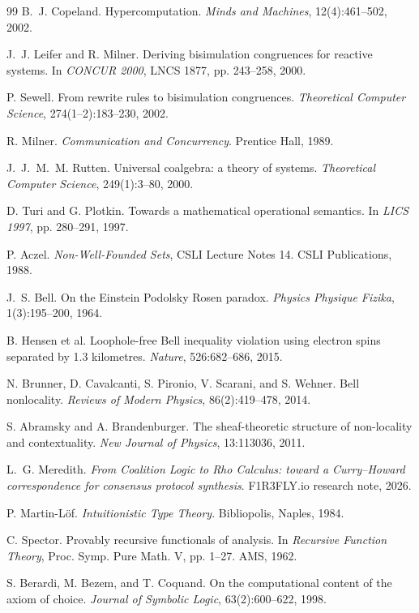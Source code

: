 \begin{thebibliography}{99}
B.~J. Copeland. Hypercomputation. \emph{Minds and Machines}, 12(4):461--502, 2002.

J.~J. Leifer and R. Milner. Deriving bisimulation congruences for reactive systems.
In \emph{CONCUR 2000}, LNCS 1877, pp. 243--258, 2000.

P. Sewell. From rewrite rules to bisimulation congruences.
\emph{Theoretical Computer Science}, 274(1--2):183--230, 2002.

R. Milner. \emph{Communication and Concurrency}. Prentice Hall, 1989.

J.~J.~M.~M. Rutten. Universal coalgebra: a theory of systems.
\emph{Theoretical Computer Science}, 249(1):3--80, 2000.

D. Turi and G. Plotkin. Towards a mathematical operational semantics.
In \emph{LICS 1997}, pp. 280--291, 1997.

P. Aczel. \emph{Non-Well-Founded Sets}, CSLI Lecture Notes 14. CSLI Publications, 1988.

J.~S. Bell. On the Einstein Podolsky Rosen paradox.
\emph{Physics Physique Fizika}, 1(3):195--200, 1964.

B. Hensen et al. Loophole-free Bell inequality violation using electron spins separated
by 1.3 kilometres. \emph{Nature}, 526:682--686, 2015.

N. Brunner, D. Cavalcanti, S. Pironio, V. Scarani, and S. Wehner. Bell nonlocality.
\emph{Reviews of Modern Physics}, 86(2):419--478, 2014.

S. Abramsky and A. Brandenburger. The sheaf-theoretic structure of non-locality and
contextuality. \emph{New Journal of Physics}, 13:113036, 2011.


L.~G. Meredith. \emph{From Coalition Logic to Rho Calculus: toward a Curry--Howard
correspondence for consensus protocol synthesis}. F1R3FLY.io research note, 2026.

P. Martin-L\"of. \emph{Intuitionistic Type Theory}. Bibliopolis, Naples, 1984.

C. Spector. Provably recursive functionals of analysis. In \emph{Recursive Function
Theory}, Proc. Symp. Pure Math. V, pp. 1--27. AMS, 1962.

S. Berardi, M. Bezem, and T. Coquand. On the computational content of the axiom of
choice. \emph{Journal of Symbolic Logic}, 63(2):600--622, 1998.


\end{thebibliography}
